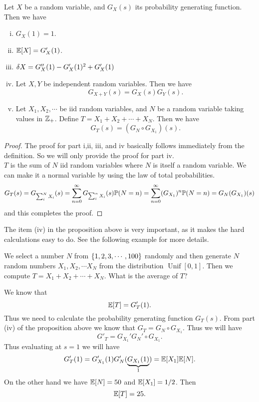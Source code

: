 \begin{proposition}
	Let $ X $ be a random variable, and $ G_X(s) $ its probability generating function. Then we have
	\begin{enumerate}[(i)]
		\item $ G_X(1) = 1 $.
		\item $ \mathbb{E}[X] = G_X'(1)  $.
		\item $ \var{X} = G_X''(1) - G_X'(1)^2 + G_X'(1) $
		\item Let $X, Y$ be independent random variables. Then we have
		\[  G_{X+Y}(s) = G_X(s) G_Y(s). \]
		\item Let $ X_1, X_2, \cdots $ be iid random variables, and $ N $ be a random variable taking values in $ \mathbb{Z}_+ $. Define $ T = X_1 + X_2 + \cdots + X_N $. Then we have
		\[ G_T(s) = (G_N \circ G_{X_1})(s). \]
	\end{enumerate}
\end{proposition}

\begin{proof}
	The proof for part i,ii, iii, and iv basically follows immediately from the definition. So we will only provide the proof for part iv.\\
	$ T $ is the sum of $ N $ iid random variables where $ N $ is itself a random variable. We can make it a normal variable by using the law of total probabilities.
	\[ G_T(s) = G_{\sum_i^N X_i}(s) = \sum_{n=0}^{\infty}  G_{\sum_i^n X_i}(s) \mathbb{P}(N = n)  = \sum_{n=0}^{\infty}(G_{X_1})^n\mathbb{P}(N=n) = G_N(G_{X_1})(s) \]
	and this completes the proof.
\end{proof}

The item (iv) in the proposition above is very important, as it makes the hard calculations easy to do. See the following example for more details.

\begin{example}
	We select a number $ N $ from $ \{1,2,3,\cdots,100\} $ randomly and then generate $ N $ random numbers $ X_1, X_2, \cdots X_N $ from the distribution $ \operatorname{Unif}[0,1]$. Then we compute $ T = X_1 + X_2 + \cdots +X_N $. What is the average of $ T $? 
	
	\begin{solution}
		We know that 
		\[ \mathbb{E}[T] = G'_T(1). \]
		Thus we need to calculate the probability generating function $ G_T(s) $. From part (iv) of the proposition above we know that $ G_T = G_N \circ G_{X_1} $. Thus we will have
		\[ G'_T = G_{X_1}' G_N'\circ G_{X_1}.  \]
		Thus evaluating at $ s=1 $ we will have
		\[ G'_T(1) = G_{X_1}'(1) G_N'(\underbrace{G_{X_1}(1)}_{1}) = \mathbb{E}[X_1] \mathbb{E}[N]. \]
		On the other hand we have $ \mathbb{E}[N] = 50 $ and $ \mathbb{E}[X_1] = 1/2 $. Then 
		\[ \mathbb{E}[T] = 25. \]
 	\end{solution}
\end{example}

